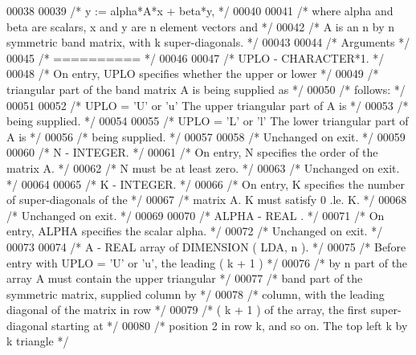\begin{DoxyCode}
00038 
00039 \textcolor{comment}{/*     y := alpha*A*x + beta*y, */}
00040 
00041 \textcolor{comment}{/*  where alpha and beta are scalars, x and y are n element vectors and */}
00042 \textcolor{comment}{/*  A is an n by n symmetric band matrix, with k super-diagonals. */}
00043 
00044 \textcolor{comment}{/*  Arguments */}
00045 \textcolor{comment}{/*  ========== */}
00046 
00047 \textcolor{comment}{/*  UPLO   - CHARACTER*1. */}
00048 \textcolor{comment}{/*           On entry, UPLO specifies whether the upper or lower */}
00049 \textcolor{comment}{/*           triangular part of the band matrix A is being supplied as */}
00050 \textcolor{comment}{/*           follows: */}
00051 
00052 \textcolor{comment}{/*              UPLO = 'U' or 'u'   The upper triangular part of A is */}
00053 \textcolor{comment}{/*                                  being supplied. */}
00054 
00055 \textcolor{comment}{/*              UPLO = 'L' or 'l'   The lower triangular part of A is */}
00056 \textcolor{comment}{/*                                  being supplied. */}
00057 
00058 \textcolor{comment}{/*           Unchanged on exit. */}
00059 
00060 \textcolor{comment}{/*  N      - INTEGER. */}
00061 \textcolor{comment}{/*           On entry, N specifies the order of the matrix A. */}
00062 \textcolor{comment}{/*           N must be at least zero. */}
00063 \textcolor{comment}{/*           Unchanged on exit. */}
00064 
00065 \textcolor{comment}{/*  K      - INTEGER. */}
00066 \textcolor{comment}{/*           On entry, K specifies the number of super-diagonals of the */}
00067 \textcolor{comment}{/*           matrix A. K must satisfy  0 .le. K. */}
00068 \textcolor{comment}{/*           Unchanged on exit. */}
00069 
00070 \textcolor{comment}{/*  ALPHA  - REAL            . */}
00071 \textcolor{comment}{/*           On entry, ALPHA specifies the scalar alpha. */}
00072 \textcolor{comment}{/*           Unchanged on exit. */}
00073 
00074 \textcolor{comment}{/*  A      - REAL             array of DIMENSION ( LDA, n ). */}
00075 \textcolor{comment}{/*           Before entry with UPLO = 'U' or 'u', the leading ( k + 1 ) */}
00076 \textcolor{comment}{/*           by n part of the array A must contain the upper triangular */}
00077 \textcolor{comment}{/*           band part of the symmetric matrix, supplied column by */}
00078 \textcolor{comment}{/*           column, with the leading diagonal of the matrix in row */}
00079 \textcolor{comment}{/*           ( k + 1 ) of the array, the first super-diagonal starting at */}
00080 \textcolor{comment}{/*           position 2 in row k, and so on. The top left k by k triangle */}

\end{DoxyCode}
